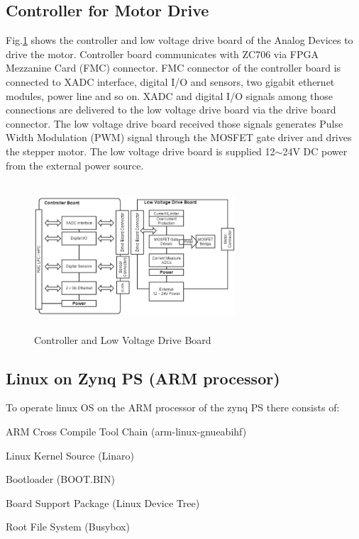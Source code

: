 \documentclass[a4paper,
              ]{jacow}
\begin{document}
\subsection{Controller for Motor Drive}
Fig.\ref{controller} shows the controller and low voltage drive board of the Analog Devices to drive the motor. Controller board communicates with ZC706 via FPGA Mezzanine Card (FMC) connector. FMC connector of the controller board is connected to XADC interface, digital I/O and sensors, two gigabit ethernet modules, power line and so on. XADC and digital I/O signals among those connections are delivered to the low voltage drive board via the drive board connector. The low voltage drive board received those signals generates Pulse Width Modulation (PWM) signal through the MOSFET gate driver and drives the stepper motor. The low voltage drive board is supplied 12${\sim}$24V DC power from the external power source.

\begin{figure}[!htb]
	\centering
	\includegraphics*[width=75mm, height=55mm]{controller}
	\caption{Controller and Low Voltage Drive Board}
	\label{controller}
\end{figure}

\subsection{Linux on Zynq PS (ARM processor)}
To operate linux OS on the ARM processor of the zynq PS there consists of:
\begin{Itemize}
	\item ARM Cross Compile Tool Chain (arm-linux-gnueabihf)
	\item Linux Kernel Source (Linaro)
	\item Bootloader (BOOT.BIN)
	\item Board Support Package (Linux Device Tree)
	\item Root File System (Busybox)
\end{Itemize}
\end{document}
